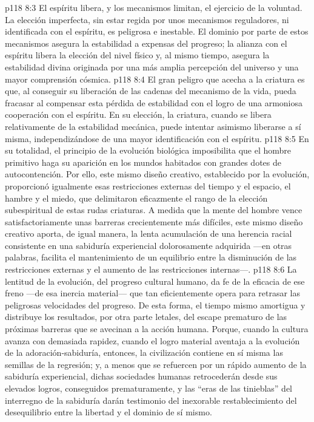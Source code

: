\vs p118 8:3 \pc El espíritu libera, y los mecanismos limitan, el ejercicio de la voluntad. La elección imperfecta, sin estar regida por unos mecanismos reguladores, ni identificada con el espíritu, es peligrosa e inestable. El dominio por parte de estos mecanismos asegura la estabilidad a expensas del progreso; la alianza con el espíritu libera la elección del nivel físico y, al mismo tiempo, asegura la estabilidad divina originada por una más amplia percepción del universo y una mayor comprensión cósmica.
\vs p118 8:4 El gran peligro que acecha a la criatura es que, al conseguir su liberación de las cadenas del mecanismo de la vida, pueda fracasar al compensar esta pérdida de estabilidad con el logro de una armoniosa cooperación con el espíritu. En su elección, la criatura, cuando se libera relativamente de la estabilidad mecánica, puede intentar asimismo liberarse a sí misma, independizándose de una mayor identificación con el espíritu.
\vs p118 8:5 En su totalidad, el principio de la evolución biológica imposibilita que el hombre primitivo haga su aparición en los mundos habitados con grandes dotes de autocontención. Por ello, este mismo diseño creativo, establecido por la evolución, proporcionó igualmente esas restricciones externas del tiempo y el espacio, el hambre y el miedo, que delimitaron eficazmente el rango de la elección subespiritual de estas rudas criaturas. A medida que la mente del hombre vence satisfactoriamente unas barreras crecientemente más difíciles, este mismo diseño creativo aporta, de igual manera, la lenta acumulación de una herencia racial consistente en una sabiduría experiencial dolorosamente adquirida ---en otras palabras, facilita el mantenimiento de un equilibrio entre la disminución de las restricciones externas y el aumento de las restricciones internas---.
\vs p118 8:6 La lentitud de la evolución, del progreso cultural humano, da fe de la eficacia de ese freno ---de esa inercia material--- que tan eficientemente opera para retrasar las peligrosas velocidades del progreso. De esta forma, el tiempo mismo amortigua y distribuye los resultados, por otra parte letales, del escape prematuro de las próximas barreras que se avecinan a la acción humana. Porque, cuando la cultura avanza con demasiada rapidez, cuando el logro material aventaja a la evolución de la adoración\hyp{}sabiduría, entonces, la civilización contiene en sí misma las semillas de la regresión; y, a menos que se refuercen por un rápido aumento de la sabiduría experiencial, dichas sociedades humanas retrocederán desde sus elevados logros, conseguidos prematuramente, y las “eras de las tinieblas” del interregno de la sabiduría darán testimonio del inexorable restablecimiento del desequilibrio entre la libertad y el dominio de sí mismo.

